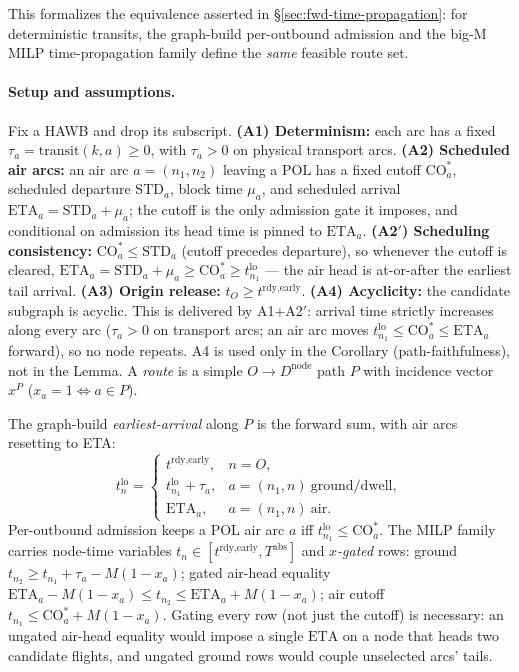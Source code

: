 \documentclass[11pt,a4paper]{article}
\theoremstyle{definition}
\begin{document}
This formalizes the equivalence asserted in \S\ref{sec:fwd-time-propagation}:
for deterministic transits, the graph-build per-outbound admission and the
big-M MILP time-propagation family define the \emph{same} feasible route set.

\paragraph{Setup and assumptions.}
Fix a HAWB and drop its subscript. \textbf{(A1) Determinism:} each arc has a
fixed $\tau_a = \text{transit}(k,a) \geq 0$, with $\tau_a > 0$ on physical
transport arcs. \textbf{(A2) Scheduled air arcs:} an air arc $a=(n_1,n_2)$
leaving a POL has a fixed cutoff $\text{CO}_a^*$, scheduled departure
$\text{STD}_a$, block time $\mu_a$, and scheduled arrival
$\text{ETA}_a = \text{STD}_a + \mu_a$; the cutoff is the only admission gate it
imposes, and conditional on admission its head time is pinned to
$\text{ETA}_a$. \textbf{(A2$'$) Scheduling consistency:} $\text{CO}_a^* \leq
\text{STD}_a$ (cutoff precedes departure), so whenever the cutoff is cleared,
$\text{ETA}_a = \text{STD}_a + \mu_a \geq \text{CO}_a^* \geq t^{\text{lo}}_{n_1}$
--- the air head is at-or-after the earliest tail arrival. \textbf{(A3) Origin
release:} $t_O \geq t^{\text{rdy,early}}$. \textbf{(A4) Acyclicity:} the
candidate subgraph is acyclic. This is delivered by A1+A2$'$: arrival time
strictly increases along every arc ($\tau_a > 0$ on transport arcs; an air arc
moves $t^{\text{lo}}_{n_1} \leq \text{CO}_a^* \leq \text{ETA}_a$ forward), so no
node repeats. A4 is used only in the Corollary (path-faithfulness), not in the
Lemma. A \emph{route} is a simple $O \to D^{\text{node}}$ path $P$ with
incidence vector $x^P$ ($x_a = 1 \iff a \in P$).

The graph-build \emph{earliest-arrival} along $P$ is the forward sum, with air
arcs resetting to ETA:
\[
t^{\text{lo}}_n =
\begin{cases}
t^{\text{rdy,early}}, & n = O,\\
t^{\text{lo}}_{n_1} + \tau_a, & a=(n_1,n)\ \text{ground/dwell},\\
\text{ETA}_a, & a=(n_1,n)\ \text{air}.
\end{cases}
\]
Per-outbound admission keeps a POL air arc $a$ iff $t^{\text{lo}}_{n_1} \leq
\text{CO}_a^*$. The MILP family carries node-time variables
$t_n \in [t^{\text{rdy,early}}, T^{\text{abs}}]$ and \emph{$x$-gated} rows:
ground $t_{n_2} \geq t_{n_1} + \tau_a - M(1-x_a)$; gated air-head equality
$\text{ETA}_a - M(1-x_a) \leq t_{n_2} \leq \text{ETA}_a + M(1-x_a)$; air cutoff
$t_{n_1} \leq \text{CO}_a^* + M(1-x_a)$. Gating every row (not just the cutoff)
is necessary: an ungated air-head equality would impose a single $\text{ETA}$
on a node that heads two candidate flights, and ungated ground rows would
couple unselected arcs' tails.
\end{document}
